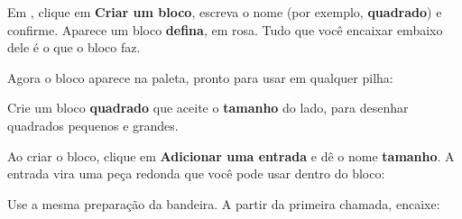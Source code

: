 Em , clique em \textbf{Criar um bloco}, escreva o nome (por exemplo, \textbf{quadrado}) e confirme. Aparece um bloco \textbf{defina}, em rosa. Tudo que você encaixar embaixo dele é o que o bloco faz.

\begin{codigo}
\begin{pilha}
\sbcend
{}
\end{pilha}
\end{codigo}

Agora o bloco  aparece na paleta, pronto para usar em qualquer pilha:

\begin{codigo}
\begin{pilha}
\end{pilha}
\end{codigo}

\begin{missao}
Crie um bloco \textbf{quadrado} que aceite o \textbf{tamanho} do lado, para desenhar quadrados pequenos e grandes.
\end{missao}

Ao criar o bloco, clique em \textbf{Adicionar uma entrada} e dê o nome \textbf{tamanho}. A entrada vira uma peça redonda que você pode usar dentro do bloco:

\begin{codigo}
\begin{pilha}
\sbcend
{}
\end{pilha}
\end{codigo}

Use a mesma preparação da bandeira. A partir da primeira chamada, encaixe:
\begin{codigo}
\begin{pilha}
\end{pilha}
\end{codigo}

